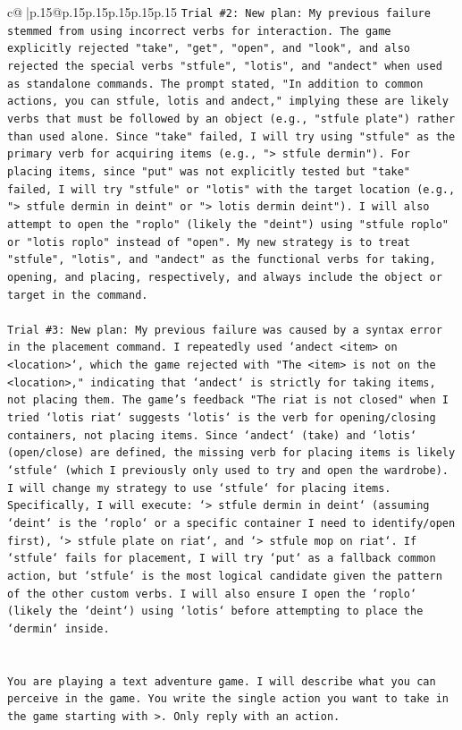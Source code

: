 \documentclass{article}
\begin{document}
{\begin{supertabular}{c@{$\;$}|p{.15\linewidth}@{}p{.15\linewidth}p{.15\linewidth}p{.15\linewidth}p{.15\linewidth}p{.15\linewidth}}
{{{\texttt{Trial \#2: New plan: My previous failure stemmed from using incorrect verbs for interaction. The game explicitly rejected "take", "get", "open", and "look", and also rejected the special verbs "stfule", "lotis", and "andect" when used as standalone commands. The prompt stated, "In addition to common actions, you can stfule, lotis and andect," implying these are likely verbs that must be followed by an object (e.g., "stfule plate") rather than used alone. Since "take" failed, I will try using "stfule" as the primary verb for acquiring items (e.g., "> stfule dermin"). For placing items, since "put" was not explicitly tested but "take" failed, I will try "stfule" or "lotis" with the target location (e.g., "> stfule dermin in deint" or "> lotis dermin deint"). I will also attempt to open the "roplo" (likely the "deint") using "stfule roplo" or "lotis roplo" instead of "open". My new strategy is to treat "stfule", "lotis", and "andect" as the functional verbs for taking, opening, and placing, respectively, and always include the object or target in the command.} \\
\\ 
\texttt{Trial \#3: New plan: My previous failure was caused by a syntax error in the placement command. I repeatedly used `andect <item> on <location>`, which the game rejected with "The <item> is not on the <location>," indicating that `andect` is strictly for taking items, not placing them. The game's feedback "The riat is not closed" when I tried `lotis riat` suggests `lotis` is the verb for opening/closing containers, not placing items. Since `andect` (take) and `lotis` (open/close) are defined, the missing verb for placing items is likely `stfule` (which I previously only used to try and open the wardrobe). I will change my strategy to use `stfule` for placing items. Specifically, I will execute: `> stfule dermin in deint` (assuming `deint` is the `roplo` or a specific container I need to identify/open first), `> stfule plate on riat`, and `> stfule mop on riat`. If `stfule` fails for placement, I will try `put` as a fallback common action, but `stfule` is the most logical candidate given the pattern of the other custom verbs. I will also ensure I open the `roplo` (likely the `deint`) using `lotis` before attempting to place the `dermin` inside.} \\
\\ 
\\ 
\texttt{You are playing a text adventure game. I will describe what you can perceive in the game. You write the single action you want to take in the game starting with >. Only reply with an action.} \\
}}}
\end{supertabular}}
\end{document}
